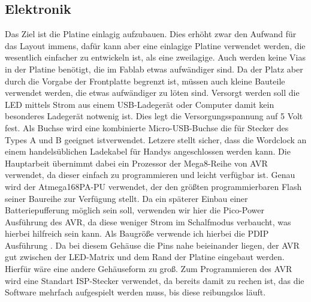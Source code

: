 \documentclass[12pt,journal,compsoc]{IEEEtran}
\begin{document}
\subsection{Elektronik}
Das Ziel ist die Platine einlagig aufzubauen. Dies erhöht zwar den Aufwand für das Layout immens, dafür kann aber eine einlagige Platine verwendet werden, die wesentlich einfacher zu entwickeln ist, als eine zweilagige. Auch werden keine Vias in der Platine benötigt, die im Fablab etwas aufwändiger sind. Da der Platz aber durch die Vorgabe der Frontplatte begrenzt ist, müssen auch kleine Bauteile verwendet werden, die etwas aufwändiger zu löten sind.
Versorgt werden soll die LED mittels Strom aus einem USB-Ladegerät oder Computer damit kein besonderes Ladegerät notwenig ist. Dies legt die Versorgungsspannung auf 5 Volt fest. Als Buchse wird eine kombinierte Micro-USB-Buchse die für Stecker des Types A und B geeignet istverwendet. Letzere stellt sicher, dass  die Wordclock an einem handelsüblichen Ladekabel für Handys angeschlossen werden kann.
 Die Hauptarbeit übernimmt dabei ein Prozessor der  Mega8-Reihe von AVR verwendet, da dieser einfach zu programmieren und leicht verfügbar ist. Genau wird der Atmega168PA-PU verwendet, der den größten programmierbaren Flash seiner Baureihe zur Verfügung stellt. Da ein späterer Einbau einer Batteriepufferung möglich sein soll, verwenden wir hier die   Pico-Power Ausführung des AVR, da diese weniger Strom im Schalfmodus verbaucht, was hierbei hilfreich sein kann. Als Baugröße verwende ich hierbei die PDIP  Ausführung . Da bei diesem Gehäuse die Pins nahe beieinander liegen, der AVR gut zwischen der LED-Matrix und dem Rand der Platine eingebaut werden. Hierfür wäre eine andere Gehäuseform zu groß. Zum Programmieren des AVR wird eine Standart ISP-Stecker verwendet, da bereits damit zu rechen ist, das die Software mehrfach aufgespielt werden muss, bis diese reibungslos läuft. 
\end{document}
